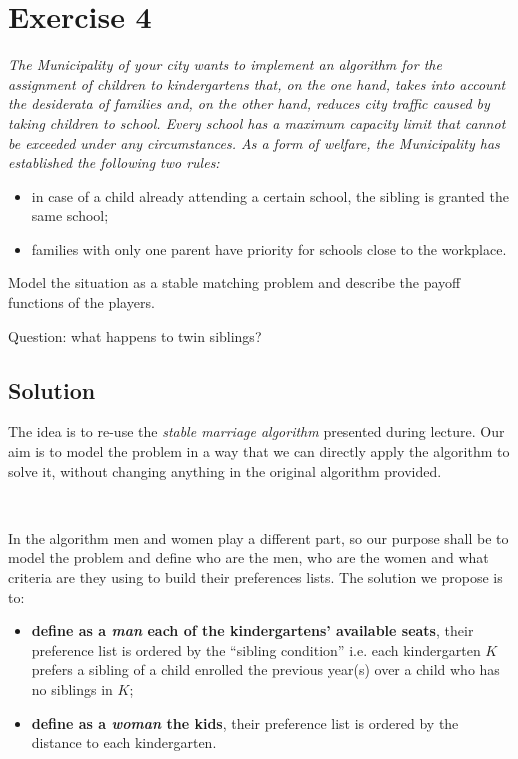 \documentclass{article}
\begin{document}
\section{Exercise 4}
{\itshape
The Municipality of your city wants to implement an algorithm for the assignment of children
to kindergartens that, on the one hand, takes into account the desiderata of families and, on
the other hand, reduces city traffic caused by taking children to school. Every school has a
maximum capacity limit that cannot be exceeded under any circumstances. As a form of welfare,
the Municipality has established the following two rules:   
\begin{itemize}
	\item  in case of a child already attending a certain school, the sibling is granted the
	same school;
	\item families with only one parent have priority for schools close to the workplace.
\end{itemize}
Model the situation as a stable matching problem and describe the payoff functions of
the players.

Question: what happens to twin siblings?   
}

\subsection{Solution}
The idea is to re-use the \textit{stable marriage algorithm} presented during lecture. Our aim is to model the problem in a way that we can directly apply the algorithm to solve it, without changing anything in the original algorithm provided.

\

In the algorithm men and women play a different part, so our purpose shall be to model
the problem and define who are the men, who are the women and what criteria are they using to build their preferences lists. The solution we propose is to:
\begin{itemize}
	\item \textbf{define as a \textit{man} each of the kindergartens' available seats}, their preference
	list is ordered by the ``sibling condition'' i.e. each kindergarten \(K\) prefers a sibling
	of a child enrolled the previous year(s) over a child who has no siblings in \(K\);
	\item \textbf{define as a \textit{woman} the kids}, their preference list is ordered by the
	distance to each kindergarten.
\end{itemize}
\end{document}
